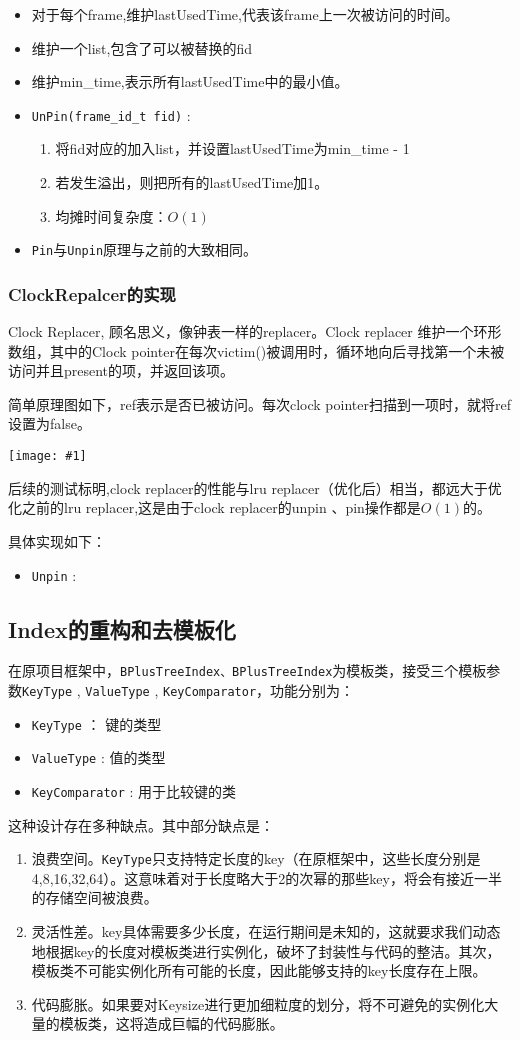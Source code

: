\documentclass[12pt, a4paper]{article}
\def\c#1{\texttt{#1}}
\def\ss#1{\subsection{#1}}
\def\sss#1{\subsubsection{#1}}
\def\fid{frame\_id\_t\ }
\def\p{\par}
\def\g#1{\begin{center}\texttt{[image: \#1]}\end{center}}
\begin{document}
\begin{itemize}
  \item 对于每个frame,维护lastUsedTime,代表该frame上一次被访问的时间。
  \item 维护一个list,包含了可以被替换的fid 
  \item 维护min\_time,表示所有lastUsedTime中的最小值。
  \item \c{UnPin(\fid fid)} :\begin{enumerate}
    \item 将fid对应的加入list，并设置lastUsedTime为min\_time - 1
    \item 若发生溢出，则把所有的lastUsedTime加1。
    \item 均摊时间复杂度：$O(1)$
  \end{enumerate} 
  \item \c{Pin}与\c{Unpin}原理与之前的大致相同。
\end{itemize}
\sss{ClockRepalcer的实现}
\p Clock Replacer, 顾名思义，像钟表一样的replacer。Clock replacer 维护一个环形数组，其中的Clock pointer在每次victim()被调用时，循环地向后寻找第一个未被访问并且present的项，并返回该项。
\p 简单原理图如下，ref表示是否已被访问。每次clock pointer扫描到一项时，就将ref设置为false。
\g{clock_replacer.pdf}
\p 后续的测试标明,clock replacer的性能与lru replacer（优化后）相当，都远大于优化之前的lru replacer,这是由于clock replacer的unpin 、pin操作都是$O(1)$的。
\p 具体实现如下：
\begin{itemize}
  \item \c{Unpin} : 
\end{itemize}
\ss{Index的重构和去模板化}
\p 在原项目框架中，\c{BPlusTreeIndex、BPlusTreeIndex}为模板类，接受三个模板参数\c{KeyType} , \c{ValueType} , \c{KeyComparator}，功能分别为：
\begin{itemize}
  \item \c{KeyType} ： 键的类型
  \item \c{ValueType} : 值的类型
  \item \c{KeyComparator} : 用于比较键的类
\end{itemize}
\p 这种设计存在多种缺点。其中部分缺点是：
\begin{enumerate}
  \item 浪费空间。\c{KeyType}只支持特定长度的key（在原框架中，这些长度分别是4,8,16,32,64）。这意味着对于长度略大于2的次幂的那些key，将会有接近一半的存储空间被浪费。
  \item 灵活性差。key具体需要多少长度，在运行期间是未知的，这就要求我们动态地根据key的长度对模板类进行实例化，破坏了封装性与代码的整洁。其次，模板类不可能实例化所有可能的长度，因此能够支持的key长度存在上限。
  \item 代码膨胀。如果要对Keysize进行更加细粒度的划分，将不可避免的实例化大量的模板类，这将造成巨幅的代码膨胀。
\end{enumerate}
\end{document}
